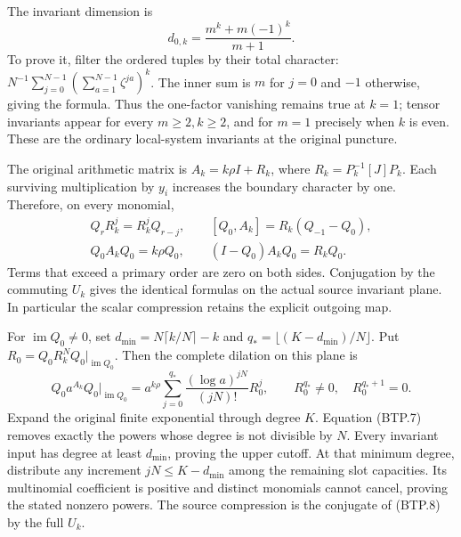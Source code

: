 The invariant dimension is
\[
 d_{0,k}=\frac{m^k+m(-1)^k}{m+1}.
\tag{BTP.6}\label{eq:btp6}
\]
To prove it, filter the ordered tuples by their total
character:
\(N^{-1}\sum_{j=0}^{N-1}(\sum_{a=1}^{N-1}\zeta^{ja})^k\).
The inner sum is \(m\) for \(j=0\) and \(-1\) otherwise,
giving the formula.  Thus the one-factor vanishing remains
true at \(k=1\); tensor invariants appear for every
\(m\geq2,k\geq2\), and for \(m=1\) precisely when
\(k\) is even.  These are the ordinary local-system
invariants at the original puncture.

The original arithmetic matrix is
\(A_k=k\rho I+R_k\), where \(R_k=P_k^{-1}[J]P_k\).
Each surviving multiplication by \(y_i\) increases the
boundary character by one.  Therefore, on every monomial,
\[
\begin{gathered}
 Q_rR_k^j=R_k^jQ_{r-j},\qquad
 [Q_0,A_k]=R_k(Q_{-1}-Q_0),\\
 Q_0A_kQ_0=k\rho Q_0,\qquad
 (I-Q_0)A_kQ_0=R_kQ_0.
\end{gathered}
\tag{BTP.7}\label{eq:btp7}
\]
Terms that exceed a primary order are zero on both sides.
Conjugation by the commuting \(U_k\) gives the identical
formulas on the actual source invariant plane.  In
particular the scalar compression retains the explicit
outgoing map.

For \(\operatorname{im}Q_0\ne0\), set
\(d_{\min}=N\lceil k/N\rceil-k\) and
\(q_* =\lfloor(K-d_{\min})/N\rfloor\).  Put
\(R_0=Q_0R_k^NQ_0|_{\operatorname{im}Q_0}\).  Then the
complete dilation on this plane is
\[
 Q_0a^{A_k}Q_0|_{\operatorname{im}Q_0}
   =a^{k\rho}\sum_{j=0}^{q_*}
       \frac{(\log a)^{jN}}{(jN)!}R_0^j,
 \qquad R_0^{q_*}\ne0,\quad R_0^{q_*+1}=0.
\tag{BTP.8}\label{eq:btp8}
\]
Expand the original finite exponential through degree
\(K\).  Equation (BTP.7) removes exactly the powers
whose degree is not divisible by \(N\).  Every invariant
input has degree at least \(d_{\min}\), proving the upper
cutoff.  At that minimum degree, distribute any increment
\(jN\leq K-d_{\min}\) among the remaining slot capacities.
Its multinomial coefficient is positive and distinct
monomials cannot cancel, proving the stated nonzero powers.
The source compression is the conjugate of (BTP.8) by the
full \(U_k\).

